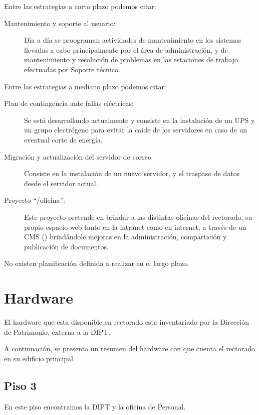 \documentclass[a4paper,11pt,oneside]{article}
\begin{document}
Entre las estrategias a corto plazo podemos citar:
%
\begin{description}
\item[Mantenimiento y soporte al usuario:]
  Día a día se proograman actividades de mantenimiento en los sistemas
  llevadas a cabo principalmente por el área de administración, y de
  mantenimiento y resolución de problemas en las estaciones de trabajo
  efectuadas por Soporte técnico.
\end{description}
Entre las estrategias a mediano plazo podemos citar:

\begin{description}
\item[Plan de contingencia ante fallas eléctricas:]
  Se está desarrollando actualmente y consiste en la instalación de un
  UPS y un grupo electrógeno para evitar la caíde de los servidores en
  caso de un eventual corte de energía.
%
\item[Migración y actualización del servidor de correo]
  Consiste en la instalación de un nuevo servidor, y el traspaso de
  datos desde el servidor actual.
%
\item[Proyecto ``/oficina'':]
  Este proyecto pretende en brindar a las distintas oficinas del
  rectorado, su propio espacio web tanto en la intranet como en
  internet, a través de un CMS ()
  brindándole mejoras en la administración, compartición y publicación
  de documentos.
\end{description}
%
No existen planificación definida a realizar en el largo plazo.
%
\section{Hardware}
%
El hardware que esta disponible en rectorado esta inventariado por la
Dirección de Patrimonio, externa a la DIPT.

A continuación, se presenta un resumen del hardware con que cuenta el
rectorado en su edificio principal.
%
\subsection*{Piso 3}
%
En este piso encontramos la DIPT y la oficina de Personal.
%
\end{document}
